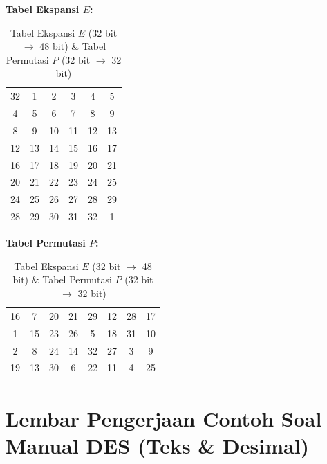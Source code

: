 \documentclass[11pt,a4paper]{article}
\begin{document}
\begin{table}[H]
\centering
\caption{Tabel Ekspansi $E$ (32 bit $\to$ 48 bit) \& Tabel Permutasi $P$ (32 bit $\to$ 32 bit)}
\vspace{0.2cm}
\begin{minipage}{0.48\textwidth}
\centering
\textbf{Tabel Ekspansi $E$:}
\begin{tabular}{|cccccc|}
\hline
32 & 1  & 2  & 3  & 4  & 5  \\
4  & 5  & 6  & 7  & 8  & 9  \\
8  & 9  & 10 & 11 & 12 & 13 \\
12 & 13 & 14 & 15 & 16 & 17 \\
16 & 17 & 18 & 19 & 20 & 21 \\
20 & 21 & 22 & 23 & 24 & 25 \\
24 & 25 & 26 & 27 & 28 & 29 \\
28 & 29 & 30 & 31 & 32 & 1  \\
\hline
\end{tabular}
\end{minipage}
\hfill
\begin{minipage}{0.48\textwidth}
\centering
\textbf{Tabel Permutasi $P$:}
\begin{tabular}{|cccccccc|}
\hline
16 & 7  & 20 & 21 & 29 & 12 & 28 & 17 \\
1  & 15 & 23 & 26 & 5  & 18 & 31 & 10 \\
2  & 8  & 24 & 14 & 32 & 27 & 3  & 9  \\
19 & 13 & 30 & 6  & 22 & 11 & 4  & 25 \\
\hline
\end{tabular}
\end{minipage}
\end{table}

\newpage
\section{Lembar Pengerjaan Contoh Soal Manual DES (Teks \& Desimal)}
\end{document}
